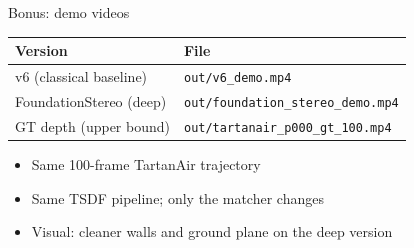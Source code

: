 \documentclass[aspectratio=169,11pt]{beamer}
\newcommand{\code}[1]{\texttt{#1}}
\begin{document}
\begin{frame}{Bonus: demo videos}
\begin{center}
\begin{tabular}{ll}
\toprule
Version & File \\
\midrule
v6 (classical baseline)        & \code{out/v6\_demo.mp4} \\
FoundationStereo (deep)        & \code{out/foundation\_stereo\_demo.mp4} \\
GT depth (upper bound)         & \code{out/tartanair\_p000\_gt\_100.mp4} \\
\bottomrule
\end{tabular}
\end{center}

\vspace{0.6em}
\begin{itemize}
    \item Same 100-frame TartanAir trajectory
    \item Same TSDF pipeline; only the matcher changes
    \item Visual: cleaner walls and ground plane on the deep version
\end{itemize}
\end{frame}
\end{document}
